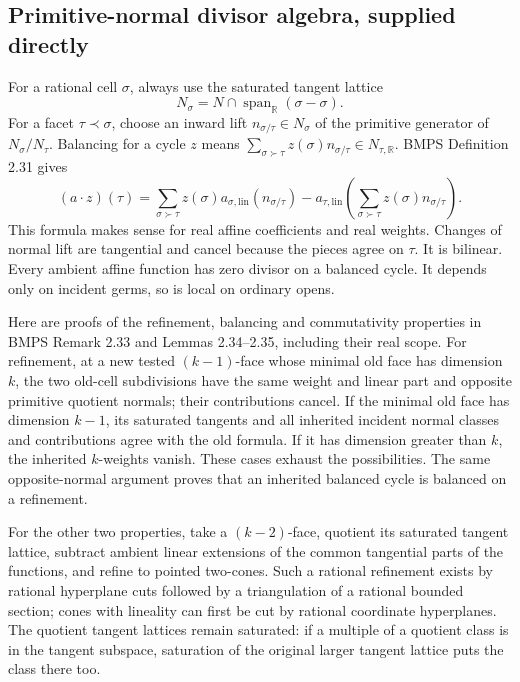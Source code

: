 \documentclass[
  11pt,
]{article}
\begin{document}
\subsection{Primitive-normal divisor algebra, supplied
directly}\label{primitive-normal-divisor-algebra-supplied-directly}

For a rational cell \(\sigma\), always use the saturated tangent lattice
\[N_\sigma=N\cap\operatorname{span}_{\mathbb R}(\sigma-\sigma).\] For a
facet \(\tau\prec\sigma\), choose an inward lift
\(n_{\sigma/\tau}\in N_\sigma\) of the primitive generator of
\(N_\sigma/N_\tau\). Balancing for a cycle \(z\) means
\(\sum_{\sigma\succ\tau}z(\sigma)n_{\sigma/\tau}\in N_{\tau,\mathbb R}\).
BMPS Definition 2.31 gives \[
(a\cdot z)(\tau)=\sum_{\sigma\succ\tau}z(\sigma)a_{\sigma,\mathrm{lin}}(n_{\sigma/\tau})
-a_{\tau,\mathrm{lin}}\left(\sum_{\sigma\succ\tau}z(\sigma)n_{\sigma/\tau}\right). \tag{4}
\] This formula makes sense for real affine coefficients and real
weights. Changes of normal lift are tangential and cancel because the
pieces agree on \(\tau\). It is bilinear. Every ambient affine function
has zero divisor on a balanced cycle. It depends only on incident germs,
so is local on ordinary opens.

Here are proofs of the refinement, balancing and commutativity
properties in BMPS Remark 2.33 and Lemmas 2.34--2.35, including their
real scope. For refinement, at a new tested \((k-1)\)-face whose minimal
old face has dimension \(k\), the two old-cell subdivisions have the
same weight and linear part and opposite primitive quotient normals;
their contributions cancel. If the minimal old face has dimension
\(k-1\), its saturated tangents and all inherited incident normal
classes and contributions agree with the old formula. If it has
dimension greater than \(k\), the inherited \(k\)-weights vanish. These
cases exhaust the possibilities. The same opposite-normal argument
proves that an inherited balanced cycle is balanced on a refinement.

For the other two properties, take a \((k-2)\)-face, quotient its
saturated tangent lattice, subtract ambient linear extensions of the
common tangential parts of the functions, and refine to pointed
two-cones. Such a rational refinement exists by rational hyperplane cuts
followed by a triangulation of a rational bounded section; cones with
lineality can first be cut by rational coordinate hyperplanes. The
quotient tangent lattices remain saturated: if a multiple of a quotient
class is in the tangent subspace, saturation of the original larger
tangent lattice puts the class there too.
\end{document}
